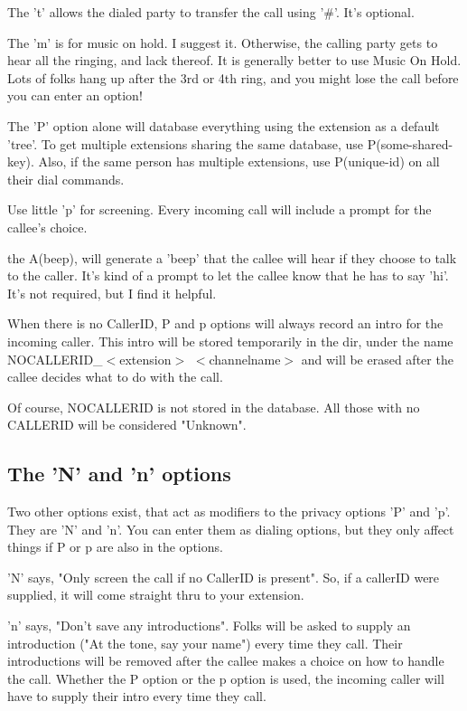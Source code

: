 The 't' allows the dialed party to transfer the call using '\#'. It's
optional.

The 'm' is for music on hold. I suggest it. Otherwise, the calling
party gets to hear all the ringing, and lack thereof. It is generally
better to use Music On Hold. Lots of folks hang up after the 3rd or
4th ring, and you might lose the call before you can enter an option!

The 'P' option alone will database everything using the extension as a
default 'tree'. To get multiple extensions sharing the same database, use
P(some-shared-key). Also, if the same person has multiple extensions,
use P(unique-id) on all their dial commands.

Use little 'p' for screening. Every incoming call will include a
prompt for the callee's choice.

the A(beep), will generate a 'beep' that the callee will hear if they
choose to talk to the caller. It's kind of a prompt to let the callee
know that he has to say 'hi'. It's not required, but I find it
helpful.

When there is no CallerID, P and p options will always record an intro
for the incoming caller. This intro will be stored temporarily in the
 dir, under the name
NOCALLERID\_$<$extension$>$ $<$channelname$>$ and will be erased after the
callee decides what to do with the call.

Of course, NOCALLERID is not stored in the database. All those with no
CALLERID will be considered "Unknown".

\subsection{The 'N' and 'n' options}

Two other options exist, that act as modifiers to the privacy options
'P' and 'p'. They are 'N' and 'n'. You can enter them as dialing
options, but they only affect things if P or p are also in the
options.

'N' says, "Only screen the call if no CallerID is present". So, if a
callerID were supplied, it will come straight thru to your extension.

'n' says, "Don't save any introductions". Folks will be asked to
supply an introduction ("At the tone, say your name") every time they
call. Their introductions will be removed after the callee makes a
choice on how to handle the call. Whether the P option or the p option
is used, the incoming caller will have to supply their intro every
time they call.


